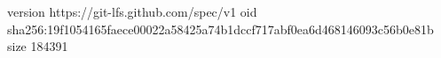 version https://git-lfs.github.com/spec/v1
oid sha256:19f1054165faece00022a58425a74b1dccf717abf0ea6d468146093c56b0e81b
size 184391
